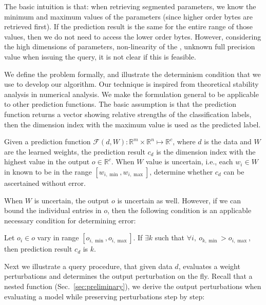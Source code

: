 \documentclass[conference]{IEEEtran}
\begin{document}
The basic intuition is that: when retrieving segmented parameters, we know the minimum and maximum values of the parameters (since higher order bytes are retrieved first). 
If the prediction result is the same for the entire range of those values, then we do not need to access the lower order bytes. 
However, considering the high dimensions of parameters, non-linearity of the \dnn\model, unknown full precision value when issuing the query, it is not clear if this is feasible.


We define the problem formally, and illustrate the determinism condition that we use to develop
our algorithm. %
Our technique is
inspired from theoretical stability analysis in numerical analysis. We make the
formulation  general to be applicable to other prediction functions. The
basic assumption is that the prediction function returns a vector showing relative
strengths of the classification labels, then the dimension index with the maximum
value is used as the predicted label. 

\begin{problem}
Given a prediction function $\mathcal{F}(d, W): \mathbb{R}^m \times \mathbb{R}^n \mapsto \mathbb{R}^c$, where $d$ is the data and $W$ are the learned weights, the prediction result $c_d$ is the dimension index with the highest value in the output $o \in \mathbb{R}^c$. When $W$ value is uncertain, i.e., each $w_i \in W$ in known to be in the range $[w_{i,\min }, w_{i, \max}]$, determine whether $c_d$ can be ascertained without error.
\end{problem}


When $W$ is uncertain, the output $o$ is uncertain as well. However, if we can bound the individual entries in $o$, then the following condition is an applicable necessary condition for determining error: 


\begin{lemma}
\label{lm:error_determinism}
Let $o_i \in o$ vary in range $[o_{i,\min}, o_{i,\max}]$. If $\exists k$ such that $\forall i,\ o_{k,\min} > o_{i,\max}$, then prediction result $c_d$ is $k$.
\end{lemma}

Next we illustrate a query procedure, that given data $d$, evaluates a \dnn\with weight perturbations and determines the output perturbation on the fly. Recall that \dnn\is a nested function (Sec.~\ref{sec:preliminary}), 
we derive the output perturbations when evaluating a model while preserving perturbations step by step:
\end{document}
